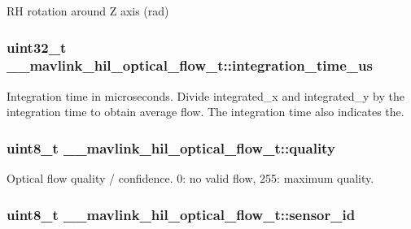 R\+H rotation around Z axis (rad) 

\hypertarget{struct____mavlink__hil__optical__flow__t_a0470ea8878cbdd05bc36eb8fd038ffe9}{
\subsubsection[{integration\+\_\+time\+\_\+us}]{\setlength{\rightskip}{0pt plus 5cm}uint32\+\_\+t \+\_\+\+\_\+mavlink\+\_\+hil\+\_\+optical\+\_\+flow\+\_\+t\+::integration\+\_\+time\+\_\+us}}\label{struct____mavlink__hil__optical__flow__t_a0470ea8878cbdd05bc36eb8fd038ffe9}


Integration time in microseconds. Divide integrated\+\_\+x and integrated\+\_\+y by the integration time to obtain average flow. The integration time also indicates the. 

\hypertarget{struct____mavlink__hil__optical__flow__t_a039f754e2192a783b41d3f6c2f62fe7d}{
\subsubsection[{quality}]{\setlength{\rightskip}{0pt plus 5cm}uint8\+\_\+t \+\_\+\+\_\+mavlink\+\_\+hil\+\_\+optical\+\_\+flow\+\_\+t\+::quality}}\label{struct____mavlink__hil__optical__flow__t_a039f754e2192a783b41d3f6c2f62fe7d}


Optical flow quality / confidence. 0\+: no valid flow, 255\+: maximum quality. 

\hypertarget{struct____mavlink__hil__optical__flow__t_ac17ff8aa6f89d8bbed3915e21fb598a6}{
\subsubsection[{sensor\+\_\+id}]{\setlength{\rightskip}{0pt plus 5cm}uint8\+\_\+t \+\_\+\+\_\+mavlink\+\_\+hil\+\_\+optical\+\_\+flow\+\_\+t\+::sensor\+\_\+id}}\label{struct____mavlink__hil__optical__flow__t_ac17ff8aa6f89d8bbed3915e21fb598a6}


